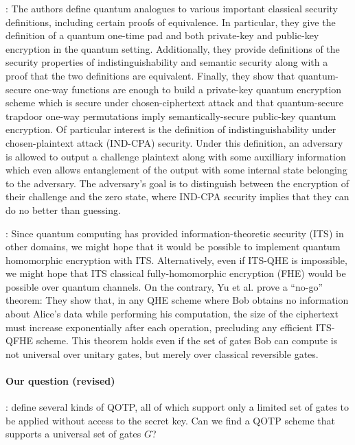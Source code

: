 \documentclass{article}
\begin{document}
\citet{alagic2016}: The authors define quantum analogues to various important
classical security definitions, including certain proofs of equivalence. In
particular, they give the definition of a quantum one-time pad and both
private-key and public-key encryption in the quantum setting. Additionally, they
provide definitions of the security properties of indistinguishability and
semantic security along with a proof that the two definitions are equivalent.
Finally, they show that quantum-secure one-way functions are enough to build a
private-key quantum encryption scheme which is secure under chosen-ciphertext
attack and that quantum-secure trapdoor one-way permutations imply
semantically-secure public-key quantum encryption. Of particular interest is the
definition of indistinguishability under chosen-plaintext attack (IND-CPA)
security. Under this definition, an adversary is allowed to output a challenge
plaintext along with some auxilliary information which even allows entanglement
of the output with some internal state belonging to the adversary. The
adversary’s goal is to distinguish between the encryption of their challenge and
the zero state, where IND-CPA security implies that they can do no better than
guessing.

\citet{yu2014}: Since quantum computing has provided information-theoretic
security (ITS) in other domains, we might hope that it would be possible to
implement quantum homomorphic encryption with ITS. Alternatively, even if
ITS-QHE is impossible, we might hope that ITS classical fully-homomorphic
encryption (FHE) would be possible over quantum channels. On the contrary, Yu et
al. prove a ``no-go'' theorem: They show that, in any QHE scheme where Bob
obtains no information about Alice's data while performing his computation, the
size of the ciphertext must increase exponentially after each operation,
precluding any efficient ITS-QFHE scheme. This theorem holds even if the set of
gates Bob can compute is not universal over unitary gates, but merely over
classical reversible gates.

\paragraph{Our question (revised)}: \citet{liang2014} define several kinds of
QOTP, all of which support only a limited set of gates to be applied without
access to the secret key. Can we find a QOTP scheme that supports a universal
set of gates $G$?
\end{document}
